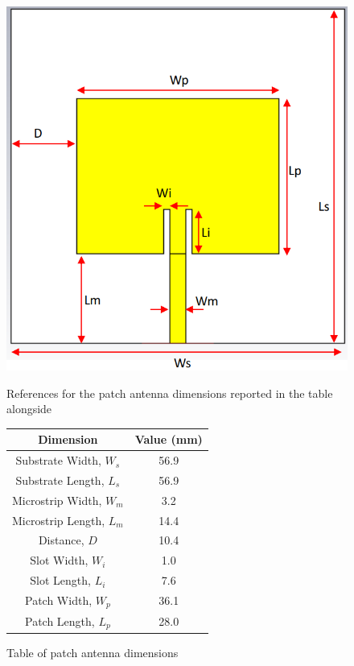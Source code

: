 \documentclass[]{article}
\begin{document}
\begin{figure}[H]
	\centering
	\begin{minipage}{0.45\linewidth}
		\centering
		\includegraphics[width=\linewidth]{img/img11}
		\caption{References for the patch antenna dimensions reported in the table alongside}
		\label{RefPatch}
	\end{minipage}\hfill
	\begin{minipage}{0.45\linewidth}
		\centering
		\captionsetup{type=table} %
		\begin{tabular}{|c|c|}
			\hline
			\textbf{Dimension} & \textbf{Value (mm)} \\
			\hline
			Substrate Width, $W_s$ & 56.9 \\
			Substrate Length, $L_s$ & 56.9 \\
			Microstrip Width, $W_m$ & 3.2 \\
			Microstrip Length, $L_m$ & 14.4 \\
			Distance, $D$ & 10.4 \\
			Slot Width, $W_i$ & 1.0 \\
			Slot Length, $L_i$ & 7.6 \\
			Patch Width, $W_p$ & 36.1 \\
			Patch Length, $L_p$ & 28.0 \\
			\hline
		\end{tabular}
		\caption{Table of patch antenna dimensions}
		\label{tab:patchDimensions}
	\end{minipage}
\end{figure}
\end{document}
